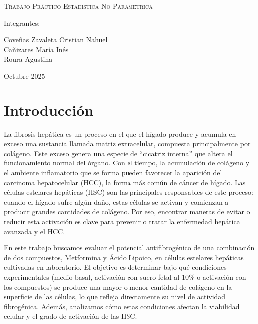\documentclass[
  10pt,
]{article}
\author{}
\date{\vspace{-2.5em}}
\begin{document}
\begin{titlepage}
    \centering
     \par 
    \vspace{3cm}
    {\scshape\Huge Trabajo Práctico Estadistica No Parametrica \par}
    \vspace{3cm}
    \vfill
    {\Large Integrantes: \par}
    {\Large Coveñas Zavaleta Cristian Nahuel\\
            Cañizares María Inés\\
            Roura Agustina \par}
    \vfill
    {\large Octubre 2025 \par}
\end{titlepage}

\section{Introducción}\label{introducciuxf3n}

La fibrosis hepática es un proceso en el que el hígado produce y acumula
en exceso una sustancia llamada matriz extracelular, compuesta
principalmente por colágeno. Este exceso genera una especie de
``cicatriz interna'' que altera el funcionamiento normal del órgano. Con
el tiempo, la acumulación de colágeno y el ambiente inflamatorio que se
forma pueden favorecer la aparición del carcinoma hepatocelular (HCC),
la forma más común de cáncer de hígado. Las células estelares hepáticas
(HSC) son las principales responsables de este proceso: cuando el hígado
sufre algún daño, estas células se activan y comienzan a producir
grandes cantidades de colágeno. Por eso, encontrar maneras de evitar o
reducir esta activación es clave para prevenir o tratar la enfermedad
hepática avanzada y el HCC.

En este trabajo buscamos evaluar el potencial antifibrogénico de una
combinación de dos compuestos, Metformina y Ácido Lipoico, en células
estelares hepáticas cultivadas en laboratorio. El objetivo es determinar
bajo qué condiciones experimentales (medio basal, activación con suero
fetal al 10\% o activación con los compuestos) se produce una mayor o
menor cantidad de colágeno en la superficie de las células, lo que
refleja directamente su nivel de actividad fibrogénica. Además,
analizamos cómo estas condiciones afectan la viabilidad celular y el
grado de activación de las HSC.
\end{document}
